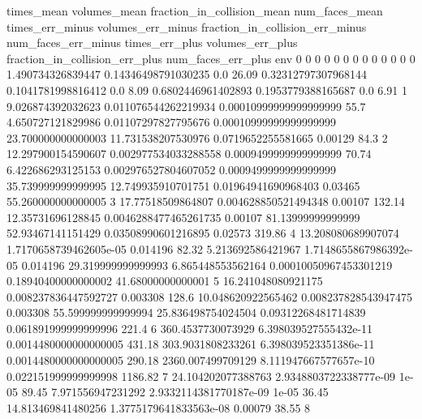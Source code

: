 times_mean	volumes_mean	fraction_in_collision_mean	num_faces_mean	times_err_minus	volumes_err_minus	fraction_in_collision_err_minus	num_faces_err_minus	times_err_plus	volumes_err_plus	fraction_in_collision_err_plus	num_faces_err_plus	env
0	0	0	0	0	0	0	0	0	0	0	0	0
1.490734326839447	0.14346498791030235	0.0	26.09	0.32312797307968144	0.1041781998816412	0.0	8.09	0.6802446961402893	0.1953779388165687	0.0	6.91	1
9.026874392032623	0.011076544262219934	0.00010999999999999999	55.7	4.650727121829986	0.01107297827795676	0.00010999999999999999	23.700000000000003	11.731538207530976	0.0719652255581665	0.00129	84.3	2
12.297900154590607	0.002977534033288558	0.0009499999999999999	70.74	6.422686293125153	0.002976527804607052	0.0009499999999999999	35.739999999999995	12.749935910701751	0.01964941690968403	0.03465	55.260000000000005	3
17.77518509864807	0.004628850521494348	0.00107	132.14	12.35731696128845	0.0046288477465261735	0.00107	81.13999999999999	52.93467141151429	0.03508990601216895	0.02573	319.86	4
13.208080689907074	1.7170658739462605e-05	0.014196	82.32	5.213692586421967	1.7148655867986392e-05	0.014196	29.319999999999993	6.865448553562164	0.00010050967453301219	0.18940400000000002	41.68000000000001	5
16.241048080921175	0.008237836447592727	0.003308	128.6	10.048620922565462	0.008237828543947475	0.003308	55.599999999999994	25.836498754024504	0.09312268481714839	0.061891999999999996	221.4	6
360.4537730073929	6.398039527555432e-11	0.0014480000000000005	431.18	303.9031808233261	6.398039523351386e-11	0.0014480000000000005	290.18	2360.007499709129	8.111947667577657e-10	0.022151999999999998	1186.82	7
24.104202077388763	2.9348803722338777e-09	1e-05	89.45	7.971556947231292	2.9332114381770187e-09	1e-05	36.45	14.813469841480256	1.3775179641833563e-08	0.00079	38.55	8
